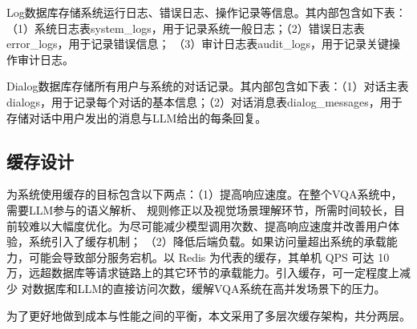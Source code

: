 \begin{table}[h]
    \centering
    \renewcommand{\arraystretch}{1.3} %
    \caption{rule\_condition表字段设置及说明}
    \label{tab:rule_conditions}
\end{table}

Log数据库存储系统运行日志、错误日志、操作记录等信息。其内部包含如下表：（1）系统日志表system\_logs，用于记录系统一般日志；（2）错误日志表error\_logs，用于记录错误信息；
（3）审计日志表audit\_logs，用于记录关键操作审计日志。

Dialog数据库存储所有用户与系统的对话记录。其内部包含如下表：（1）对话主表dialogs，用于记录每个对话的基本信息；（2）对话消息表dialog\_messages，用于
存储对话中用户发出的消息与LLM给出的每条回复。

\subsection{缓存设计}
为系统使用缓存的目标包含以下两点：（1）提高响应速度。在整个VQA系统中，需要LLM参与的语义解析、
规则修正以及视觉场景理解环节，所需时间较长，目前较难以大幅度优化。为尽可能减少模型调用次数、提高响应速度并改善用户体验，系统引入了缓存机制；
（2）降低后端负载。如果访问量超出系统的承载能力，可能会导致部分服务宕机。以 Redis 为代表的缓存，其单机 QPS 可达 10 万，远超数据库等请求链路上的其它环节的承载能力。引入缓存，可一定程度上减少
对数据库和LLM的直接访问次数，缓解VQA系统在高并发场景下的压力。

为了更好地做到成本与性能之间的平衡，本文采用了多层次缓存架构，共分两层。

